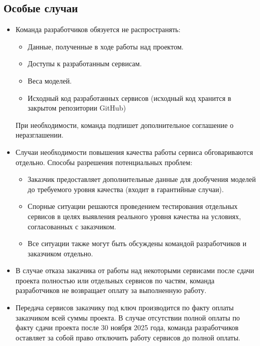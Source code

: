 \documentclass[12pt]{article}
\begin{document}
\subsection{Особые случаи}
\begin{itemize}
	\item Команда разработчиков обязуется не распространять:
	      \begin{itemize}
		      \item Данные, полученные в ходе работы над проектом.
		      \item Доступы к разработанным сервисам.
		      \item Веса моделей.
		      \item Исходный код разработанных сервисов (исходный код хранится в закрытом репозитории GitHub)
	      \end{itemize}
	      При необходимости, команда подпишет дополнительное соглашение о неразглашении.
	\item Случаи необходимости повышения качества работы сервиса обговариваются отдельно. Способы разрешения потенциальных проблем:
	      \begin{itemize}
		      \item Заказчик предоставляет дополнительные данные для дообучения моделей до требуемого уровня качества (входит в гарантийные случаи).
		      \item Спорные ситуации решаются проведением тестирования отдельных сервисов в целях выявления реального уровня качества на условиях, согласованных с заказчиком.
		      \item Все ситуации также могут быть обсуждены командой разработчиков и заказчиком отдельно.
	      \end{itemize}
	\item В случае отказа заказчика от работы над некоторыми сервисами после сдачи проекта полностью или отдельных сервисов по частям, команда разработчиков не возвращает оплату за выполненную работу.
	\item Передача сервисов заказчику под ключ производится по факту оплаты заказчиком всей суммы проекта. В случае отсутствии полной оплаты по факту сдачи проекта после 30 ноября 2025 года, команда разработчиков оставляет за собой право отключить работу сервисов до полной оплаты.
\end{itemize}
\end{document}
